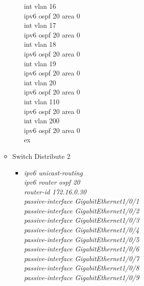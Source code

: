 \documentclass[a4paper, 12pt]{article}
\begin{document}
\begin{itemize}
\begin{itemize}
\begin{itemize}
{                        int vlan 16\\
                        ipv6 ospf 20 area 0\\
                        int vlan 17\\
                        ipv6 ospf 20 area 0\\
                        int vlan 18\\
                        ipv6 ospf 20 area 0\\
                        int vlan 19\\
                        ipv6 ospf 20 area 0\\
                        int vlan 20\\
                        ipv6 ospf 20 area 0\\
                        int vlan 110\\
                        ipv6 ospf 20 area 0\\
                        int vlan 200\\
                        ipv6 ospf 20 area 0\\
                        ex\\}
\end{itemize}
             \item Switch Distribute 2
        \begin{itemize}
         \item \textit{ipv6 unicast-routing\\
                        ipv6 router ospf 20\\
                        router-id 172.16.0.30\\
                         passive-interface GigabitEthernet1/0/1\\
                         passive-interface GigabitEthernet1/0/2\\
                         passive-interface GigabitEthernet1/0/3\\
                         passive-interface GigabitEthernet1/0/4\\
                         passive-interface GigabitEthernet1/0/5\\
                         passive-interface GigabitEthernet1/0/6\\
                         passive-interface GigabitEthernet1/0/7\\
                         passive-interface GigabitEthernet1/0/8\\
                         passive-interface GigabitEthernet1/0/9\\
}
\end{itemize}
\end{itemize}
\end{itemize}
\end{document}
